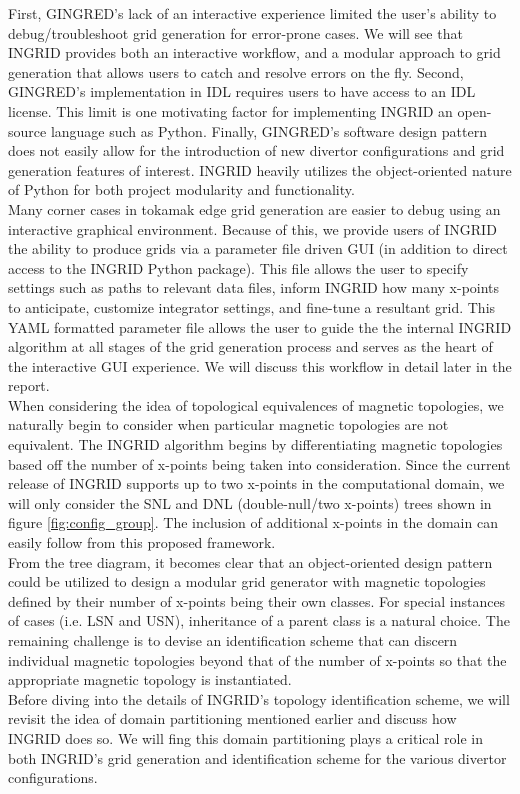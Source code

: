 \indent
First, GINGRED's lack of an interactive experience limited the user's ability to debug/troubleshoot grid generation for error-prone cases. We will see that INGRID provides both an interactive workflow, and a modular approach to grid generation that allows users to catch and resolve errors on the fly. Second, GINGRED's implementation in IDL requires users to have access to an IDL license. This limit is one motivating factor for implementing INGRID an open-source language such as Python. Finally, GINGRED's software design pattern does not easily allow for the introduction of new divertor configurations and grid generation features of interest. INGRID heavily utilizes the object-oriented nature of Python for both project modularity and functionality.\\ \indent
Many corner cases in tokamak edge grid generation are easier to debug using an interactive graphical environment. Because of this, we provide users of INGRID the ability to produce grids via a parameter file driven GUI (in addition to direct access to the INGRID Python package). This file allows the user to specify settings such as paths to relevant data files, inform INGRID how many x-points to anticipate, customize integrator settings, and fine-tune a resultant grid. This YAML formatted parameter file allows the user to guide the the internal INGRID algorithm at all stages of the grid generation process and serves as the heart of the interactive GUI experience. We will discuss this workflow in detail later in the report.\\
\indent
When considering the idea of topological equivalences of magnetic topologies, we naturally begin to consider when particular magnetic topologies are not equivalent. The INGRID algorithm begins by differentiating magnetic topologies based off the number of x-points being taken into consideration. Since the current release of INGRID supports up to two x-points in the computational domain, we will only consider the SNL and DNL (double-null/two x-points) trees shown in figure \ref{fig:config_group}. The inclusion of additional x-points in the domain can easily follow from this proposed framework. \\ \indent
From the tree diagram, it becomes clear that an object-oriented design pattern could be utilized to design a modular grid generator with magnetic topologies defined by their number of x-points being their own classes. For special instances of cases (i.e. LSN and USN), inheritance of a parent class is a natural choice. The remaining challenge is to devise an identification scheme that can discern individual magnetic topologies beyond that of the number of x-points so that the appropriate magnetic topology is instantiated.\\
Before diving into the details of INGRID's topology identification scheme, we will revisit the idea of domain partitioning mentioned earlier and discuss how INGRID does so. We will fing this domain partitioning plays a critical role in both INGRID's grid generation and identification scheme for the various divertor configurations.
